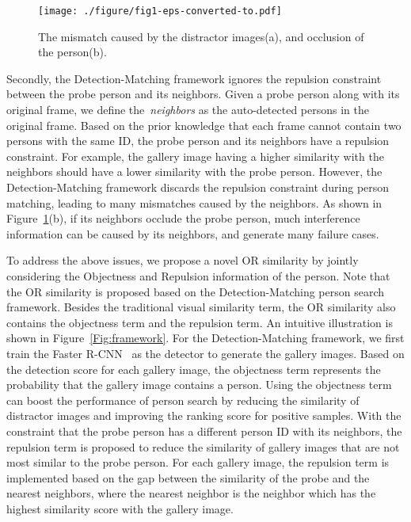 \documentclass[journal]{IEEEtran}
\begin{document}
\begin{figure}
\texttt{[image: ./figure/fig1-eps-converted-to.pdf]}
\caption{The mismatch caused by the distractor images(a), and occlusion of the person(b). }
\label{Fig:samples}
\end{figure}

Secondly, the Detection-Matching framework ignores the repulsion constraint between the probe person and its neighbors.
Given a probe person along with its original frame, we define the~\emph{neighbors} as the auto-detected persons in the original frame.
Based on the prior knowledge that each frame cannot contain two persons with the same ID,  the probe person and its neighbors have a repulsion constraint.
For example, the gallery image having a higher similarity with the neighbors should have a lower similarity with the probe person.
However, the Detection-Matching framework discards the repulsion constraint during person matching, leading to many mismatches caused by the neighbors.
As shown in Figure~\ref{Fig:samples}(b), if its neighbors occlude the probe person, much interference information can be caused by its neighbors, and generate many failure cases. 

To address the above issues, we propose a novel OR similarity by jointly considering the Objectness and Repulsion information of the person. 
Note that the OR similarity is proposed based on the Detection-Matching person search framework.
Besides the traditional visual similarity term, the OR similarity also contains the objectness term and the repulsion term.  
An intuitive illustration is shown in Figure~\ref{Fig:framework}. 
For the Detection-Matching framework, we first train the Faster R-CNN~\cite{RenHG017} as the detector to generate the gallery images. 
Based on the detection score for each gallery image, the objectness term represents the probability that the gallery image contains a person. 
Using the objectness term can boost the performance of person search by reducing the similarity of distractor images and improving the ranking score for positive samples.
With the constraint that the probe person has a different person ID with its neighbors, the repulsion term is proposed to reduce the similarity of gallery images that are not most similar to the probe person. 
For each gallery image, the repulsion term is implemented based on the gap between the similarity of the probe and the nearest neighbors, where the nearest neighbor is the neighbor which has the highest similarity score with the gallery image. 
\end{document}
